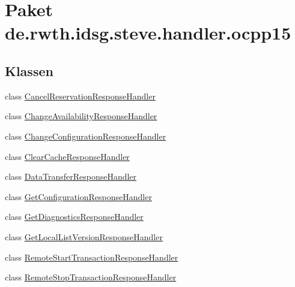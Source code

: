 \hypertarget{namespacede_1_1rwth_1_1idsg_1_1steve_1_1handler_1_1ocpp15}{\section{Paket de.\+rwth.\+idsg.\+steve.\+handler.\+ocpp15}
\label{namespacede_1_1rwth_1_1idsg_1_1steve_1_1handler_1_1ocpp15}
}
\subsection*{Klassen}
\begin{DoxyCompactItemize}
\item 
class \hyperlink{classde_1_1rwth_1_1idsg_1_1steve_1_1handler_1_1ocpp15_1_1_cancel_reservation_response_handler}{Cancel\+Reservation\+Response\+Handler}
\item 
class \hyperlink{classde_1_1rwth_1_1idsg_1_1steve_1_1handler_1_1ocpp15_1_1_change_availability_response_handler}{Change\+Availability\+Response\+Handler}
\item 
class \hyperlink{classde_1_1rwth_1_1idsg_1_1steve_1_1handler_1_1ocpp15_1_1_change_configuration_response_handler}{Change\+Configuration\+Response\+Handler}
\item 
class \hyperlink{classde_1_1rwth_1_1idsg_1_1steve_1_1handler_1_1ocpp15_1_1_clear_cache_response_handler}{Clear\+Cache\+Response\+Handler}
\item 
class \hyperlink{classde_1_1rwth_1_1idsg_1_1steve_1_1handler_1_1ocpp15_1_1_data_transfer_response_handler}{Data\+Transfer\+Response\+Handler}
\item 
class \hyperlink{classde_1_1rwth_1_1idsg_1_1steve_1_1handler_1_1ocpp15_1_1_get_configuration_response_handler}{Get\+Configuration\+Response\+Handler}
\item 
class \hyperlink{classde_1_1rwth_1_1idsg_1_1steve_1_1handler_1_1ocpp15_1_1_get_diagnostics_response_handler}{Get\+Diagnostics\+Response\+Handler}
\item 
class \hyperlink{classde_1_1rwth_1_1idsg_1_1steve_1_1handler_1_1ocpp15_1_1_get_local_list_version_response_handler}{Get\+Local\+List\+Version\+Response\+Handler}
\item 
class \hyperlink{classde_1_1rwth_1_1idsg_1_1steve_1_1handler_1_1ocpp15_1_1_remote_start_transaction_response_handler}{Remote\+Start\+Transaction\+Response\+Handler}
\item 
class \hyperlink{classde_1_1rwth_1_1idsg_1_1steve_1_1handler_1_1ocpp15_1_1_remote_stop_transaction_response_handler}{Remote\+Stop\+Transaction\+Response\+Handler}

\end{DoxyCompactItemize}
